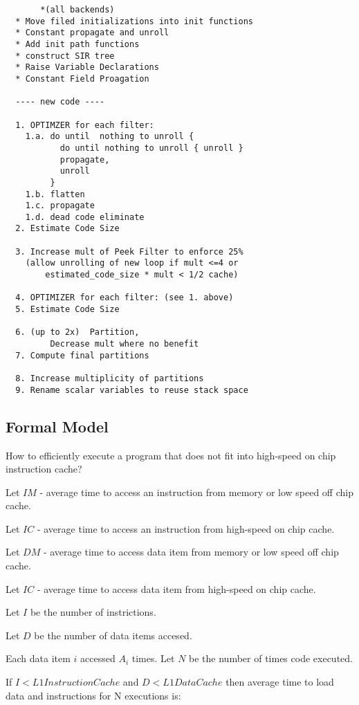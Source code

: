 \documentclass{sig-alternate}
\begin{document}
\begin{verbatim}
       *(all backends)
  * Move filed initializations into init functions
  * Constant propagate and unroll
  * Add init path functions
  * construct SIR tree
  * Raise Variable Declarations
  * Constant Field Proagation

  ---- new code ----

  1. OPTIMZER for each filter:
    1.a. do until  nothing to unroll {  
           do until nothing to unroll { unroll } 
           propagate, 
           unroll 
         }
    1.b. flatten
    1.c. propagate
    1.d. dead code eliminate
  2. Estimate Code Size
  
  3. Increase mult of Peek Filter to enforce 25%
    (allow unrolling of new loop if mult <=4 or 
        estimated_code_size * mult < 1/2 cache)

  4. OPTIMIZER for each filter: (see 1. above)
  5. Estimate Code Size
    
  6. (up to 2x)  Partition, 
         Decrease mult where no benefit
  7. Compute final partitions

  8. Increase multiplicity of partitions
  9. Rename scalar variables to reuse stack space

\end{verbatim}

\subsection{Formal Model}

How to efficiently execute a program that does not fit into
high-speed on chip instruction cache?

Let $IM$ - average time to access an instruction from memory
or low speed off chip cache.

Let $IC$ - average time to access an instruction from high-speed
on chip cache.

Let $DM$ - average time to access data item from memory
or low speed off chip cache.

Let $IC$ - average time to access data item from high-speed
on chip cache.

Let $I$ be the number of instrictions. 

Let $D$ be the number of data items accesed.

Each data item $i$ accessed $A_i$ times.
Let $N$ be the number of times code executed.

If $I < L1InstructionCache$ and $D < L1DataCache$ then average
time to load data and instructions for N executions is:
\end{document}
